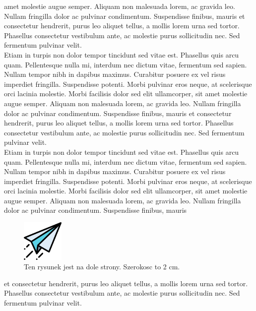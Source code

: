 \documentclass[11pt,a4paper]{article}
\begin{document}
amet molestie augue semper. Aliquam non malesuada lorem, ac gravida leo.
Nullam fringilla dolor ac pulvinar condimentum. Suspendisse finibus, mauris
et consectetur hendrerit, purus leo aliquet tellus, a mollis lorem urna sed
tortor. Phasellus consectetur vestibulum ante, ac molestie purus sollicitudin
nec. Sed fermentum pulvinar velit.
\\
\parindent 0.5cm
Etiam in turpis non dolor tempor tincidunt sed vitae est. Phasellus quis
arcu quam. Pellentesque nulla mi, interdum nec dictum vitae, fermentum sed
sapien. Nullam tempor nibh in dapibus maximus. Curabitur posuere ex vel
risus imperdiet fringilla. Suspendisse potenti. Morbi pulvinar eros neque, at
scelerisque orci lacinia molestie. Morbi facilisis dolor sed elit ullamcorper, sit
amet molestie augue semper. Aliquam non malesuada lorem, ac gravida leo.
Nullam fringilla dolor ac pulvinar condimentum. Suspendisse finibus, mauris
et consectetur hendrerit, purus leo aliquet tellus, a mollis lorem urna sed
tortor. Phasellus consectetur vestibulum ante, ac molestie purus sollicitudin
nec. Sed fermentum pulvinar velit.
\\
\parindent 0.5cm
Etiam in turpis non dolor tempor tincidunt sed vitae est. Phasellus quis
arcu quam. Pellentesque nulla mi, interdum nec dictum vitae, fermentum sed
sapien. Nullam tempor nibh in dapibus maximus. Curabitur posuere ex vel
risus imperdiet fringilla. Suspendisse potenti. Morbi pulvinar eros neque, at
scelerisque orci lacinia molestie. Morbi facilisis dolor sed elit ullamcorper, sit
amet molestie augue semper. Aliquam non malesuada lorem, ac gravida leo.
Nullam fringilla dolor ac pulvinar condimentum. Suspendisse finibus, mauris
\begin{figure}[h]
\includegraphics[width=2cm]{ZestawP309/paper.png} 
\centering
\caption{Ten rysunek jest na dole strony. Szerokosc to 2 cm.}
\label{fig:ZestawP309/paper.png}
\end{figure}

\newpage
\begingroup
\raggedright
et consectetur hendrerit, purus leo aliquet tellus, a mollis lorem urna sed
tortor. Phasellus consectetur vestibulum ante, ac molestie purus sollicitudin
nec. Sed fermentum pulvinar velit.
\endgroup
\end{document}
